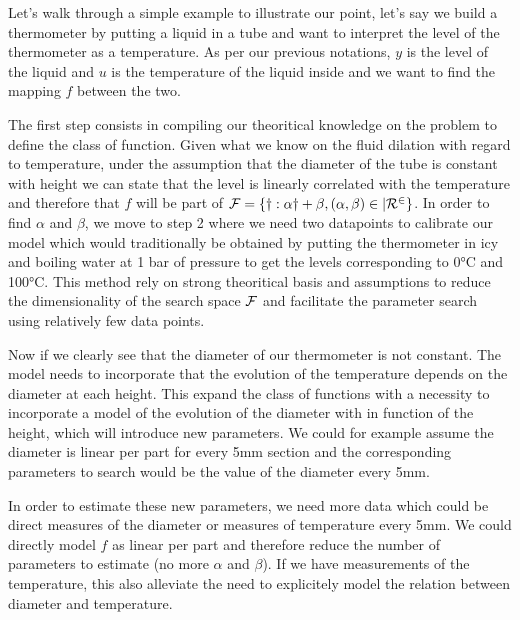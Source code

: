 \begin{bibunit}
Let's walk through a simple example to illustrate our point, let's say we build a thermometer by putting a liquid in a tube and want to interpret the level of the thermometer as a temperature.
 As per our previous notations, $y$ is the level of the liquid and $u$ is the temperature of the liquid inside and we want to find the mapping $f$ between the two.

  The first step consists in compiling our theoritical knowledge on the problem to define the class of function. Given what we know on the fluid dilation with regard to temperature, under the assumption that the diameter of the tube is constant with height we can state that the level is linearly correlated with the temperature and therefore that $f$ will be part of $\cal{F} = \{ y: \alpha y + \beta , (\alpha, \beta) \in |R^2 \}$.
In order to find $\alpha$ and $\beta$, we move to step 2 where we need two datapoints to calibrate our model which would traditionally be obtained by putting the thermometer in icy and boiling water at 1 bar of pressure to get the levels corresponding to 0°C and 100°C.
  This method rely on strong theoritical basis and assumptions to reduce the dimensionality of the search space $\cal{F}$ and facilitate the parameter search using relatively few data points.

Now if we clearly see that the diameter of our thermometer is not constant. The model needs to incorporate that the evolution of the temperature depends on the diameter at each height. This expand the class of functions with a necessity to incorporate a model of the evolution of the diameter with in function of the height, which will introduce new parameters. We could for example assume the diameter is linear per part for every 5mm section and the corresponding parameters to search would be the value of the diameter every 5mm.

  In order to estimate these new parameters, we need more data which could be direct measures of the diameter or measures of temperature every 5mm.
  We could directly model $f$ as linear per part and therefore reduce the number of parameters to estimate (no more $\alpha$ and $\beta$). If we have measurements of the temperature, this also alleviate the need to explicitely model the relation between diameter and temperature.






  


\end{bibunit}
